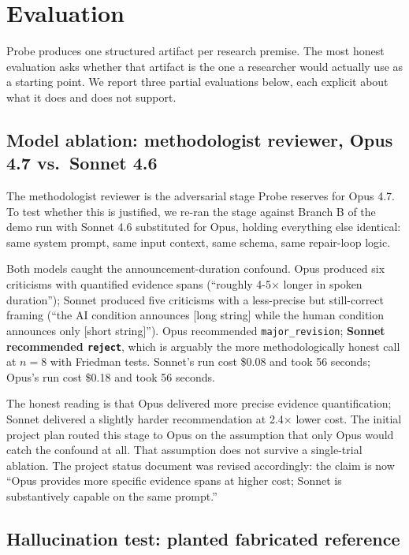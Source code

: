 \section{Evaluation}
\label{sec:eval}

Probe produces one structured artifact per research premise. The most honest evaluation asks whether that artifact is the one a researcher would actually use as a starting point. We report three partial evaluations below, each explicit about what it does and does not support.

\subsection{Model ablation: methodologist reviewer, Opus 4.7 vs.\ Sonnet 4.6}

The methodologist reviewer is the adversarial stage Probe reserves for Opus 4.7. To test whether this is justified, we re-ran the stage against Branch B of the demo run with Sonnet 4.6 substituted for Opus, holding everything else identical: same system prompt, same input context, same schema, same repair-loop logic.

Both models caught the announcement-duration confound. Opus produced six criticisms with quantified evidence spans (``roughly 4-5$\times$ longer in spoken duration''); Sonnet produced five criticisms with a less-precise but still-correct framing (``the AI condition announces [long string] while the human condition announces only [short string]''). Opus recommended \texttt{major\_revision}; \textbf{Sonnet recommended \texttt{reject}}, which is arguably the more methodologically honest call at $n=8$ with Friedman tests. Sonnet's run cost \$0.08 and took 56 seconds; Opus's run cost \$0.18 and took 56 seconds.

The honest reading is that Opus delivered more precise evidence quantification; Sonnet delivered a slightly harder recommendation at 2.4$\times$ lower cost. The initial project plan routed this stage to Opus on the assumption that only Opus would catch the confound at all. That assumption does not survive a single-trial ablation. The project status document was revised accordingly: the claim is now ``Opus provides more specific evidence spans at higher cost; Sonnet is substantively capable on the same prompt.''

\subsection{Hallucination test: planted fabricated reference}

